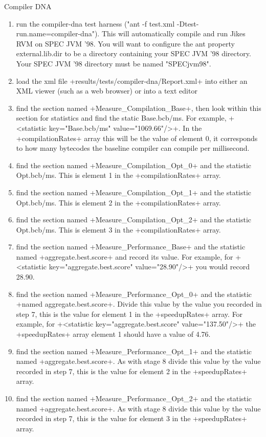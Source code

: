 \begin{section}{Compiler DNA}
\begin{enumerate}
    \item run the compiler-dna test harness ("ant -f test.xml -Dtest-run.name=compiler-dna"). This will automatically compile and run Jikes RVM on SPEC JVM '98. You will want to configure the ant property external.lib.dir to be a directory containing your SPEC JVM '98 directory. Your SPEC JVM '98 directory must be named "SPECjvm98".
    \item load the xml file \spverb+results/tests/compiler-dna/Report.xml+ into either an XML viewer (such as a web browser) or into a text editor
    \item find the section named \spverb+Measure_Compilation_Base+, then look within this section for statistics and find the static Base.bcb/ms. For example, \spverb+<statistic key="Base.bcb/ms" value="1069.66"/>+. In the \newline \spverb+compilationRates+ array this will be the value of element 0, it corresponds to how many bytecodes the baseline compiler can compile per millisecond.
    \item find the section named \spverb+Measure_Compilation_Opt_0+ and the statistic Opt.bcb/ms. This is element 1 in the \spverb+compilationRates+ array.
    \item find the section named \spverb+Measure_Compilation_Opt_1+ and the statistic Opt.bcb/ms. This is element 2 in the \spverb+compilationRates+ array.
    \item find the section named \spverb+Measure_Compilation_Opt_2+ and the statistic Opt.bcb/ms. This is element 3 in the \spverb+compilationRates+ array.
    \item find the section named \spverb+Measure_Performance_Base+ and the statistic named \spverb+aggregate.best.score+ and record its value. For example, for \spverb+<statistic key="aggregate.best.score" value="28.90"/>+ you would record 28.90.
    \item find the section named \spverb+Measure_Performance_Opt_0+ and the statistic \spverb+named aggregate.best.score+. Divide this value by the value you recorded in step 7, this is the value for element 1 in the \spverb+speedupRates+ array. For example, for \spverb+<statistic key="aggregate.best.score" value="137.50"/>+ the \spverb+speedupRates+ array element 1 should have a value of 4.76.
    \item find the section named \spverb+Measure_Performance_Opt_1+ and the statistic named \spverb+aggregate.best.score+. As with stage 8 divide this value by the value recorded in step 7, this is the value for element 2 in the \spverb+speedupRates+ array.
    \item find the section named \spverb+Measure_Performance_Opt_2+ and the statistic named \spverb+aggregate.best.score+. As with stage 8 divide this value by the value recorded in step 7, this is the value for element 3 in the \spverb+speedupRates+ array.
\end{enumerate}


\end{section}
